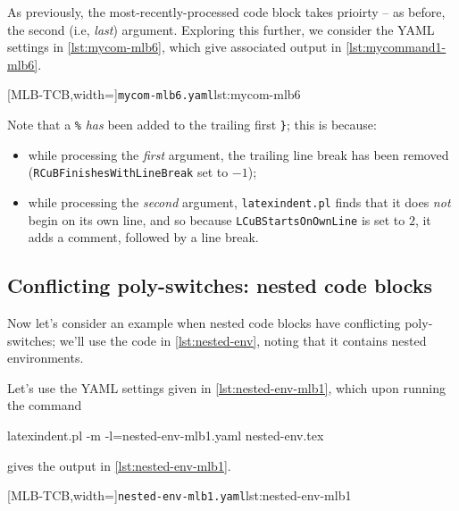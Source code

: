 	As previously, the most-recently-processed code block takes prioirty -- as before, the second (i.e, \emph{last}) argument. Exploring this
	further, we consider the YAML settings in \cref{lst:mycom-mlb6}, which give associated output in \cref{lst:mycommand1-mlb6}.

	\begin{minipage}{.4\linewidth}
	\end{minipage}
	\hfill
	\begin{minipage}{.55\linewidth}
		[MLB-TCB,width=\linewidth]{\texttt{mycom-mlb6.yaml}}{lst:mycom-mlb6}
	\end{minipage}

	Note that a \lstinline!%! \emph{has} been added to the trailing first \lstinline!}!; this is because:
	\begin{itemize}
		\item while processing the \emph{first} argument, the trailing line break has been removed (\texttt{RCuBFinishesWithLineBreak} set to $-1$);
		\item while processing the \emph{second} argument, \texttt{latexindent.pl} finds that it does \emph{not} begin on its own line, and so
		      because \texttt{LCuBStartsOnOwnLine} is set to $2$, it adds a comment, followed by a line break.
	\end{itemize}

\subsection{Conflicting poly-switches: nested code blocks}
	Now let's consider an example when nested code blocks have conflicting poly-switches; we'll use the code in \cref{lst:nested-env},
	noting that it contains nested environments.


	Let's use the YAML settings given in \cref{lst:nested-env-mlb1}, which upon running the command
	\begin{commandshell}
latexindent.pl -m -l=nested-env-mlb1.yaml nested-env.tex
        \end{commandshell}
	gives the output in \cref{lst:nested-env-mlb1}.

	\begin{minipage}{.45\linewidth}
	\end{minipage}
	\hfill
	\begin{minipage}{.55\linewidth}
		[MLB-TCB,width=\linewidth]{\texttt{nested-env-mlb1.yaml}}{lst:nested-env-mlb1}
	\end{minipage}

